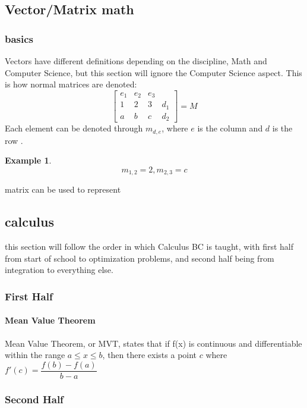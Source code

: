 \documentclass{article} %
\theoremstyle{theorem}
\newtheorem{exmat}{Example}[subsection]
\theoremstyle{definition}
\begin{document}
    \subsection{Vector/Matrix math} %
    \label{sub:vecMat}
        \subsubsection{basics}
            Vectors have different definitions depending on the discipline, Math and Computer Science, but this section will ignore the Computer Science aspect.
            This is how normal matrices are denoted:
            \[\begin{bmatrix}
                e_1 & e_2 & e_3 & \\
                1 & 2 & 3 & d_1\\
                a & b & c & d_2
            \end{bmatrix}=M\]
            Each element can be denoted through $m_{d,e}$, where $e$ is the column and $d$ is the row .
            \begin{exmat}
                \[
                    m_{1,2}=2, m_{2,3}=c
                \]
            \end{exmat}
            matrix can be used to represent 
    \pagebreak
    \subsection{calculus}
    this section will follow the order in which Calculus BC is taught, with first half from start of school to optimization problems, and second half being from integration to everything else.
        \subsubsection{First Half}
            \paragraph{Mean Value Theorem} %
            \label{ssub:Mean Value Theorem}
                    Mean Value Theorem, or MVT, states that if f(x) is continuous and differentiable within the range $a\le x \le b$, then there exists a point $c$ where $f'(c) = \dfrac{f(b)-f(a)}{b-a}$
        \subsubsection{Second Half}
\end{document}
